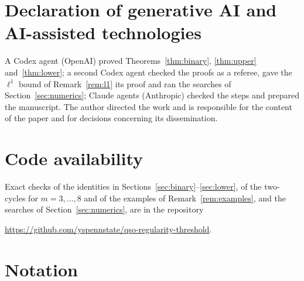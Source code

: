 \documentclass[11pt]{amsart}
\theoremstyle{definition}
\theoremstyle{remark}
\begin{document}
\section*{Declaration of generative AI and AI-assisted technologies}
A Codex agent (OpenAI) proved Theorems~\ref{thm:binary}, \ref{thm:upper} and~\ref{thm:lower}; a second Codex agent
checked the proofs as a referee, gave the $\ell^1$ bound of Remark~\ref{rem:l1} its proof and ran the searches of
Section~\ref{sec:numerics}; Claude agents (Anthropic) checked the steps and prepared the manuscript. The author directed
the work and is responsible for the content of the paper and for decisions concerning its dissemination.

\section*{Code availability}
Exact checks of the identities in Sections~\ref{sec:binary}--\ref{sec:lower}, of the two-cycles for $m=3,\dots,8$ and of
the examples of Remark~\ref{rem:examples}, and the searches of Section~\ref{sec:numerics}, are in the repository
\begin{center}\url{https://github.com/yspennstate/qso-regularity-threshold}.\end{center}

\appendix
\section{Notation}\label{app:notation}
\end{document}
